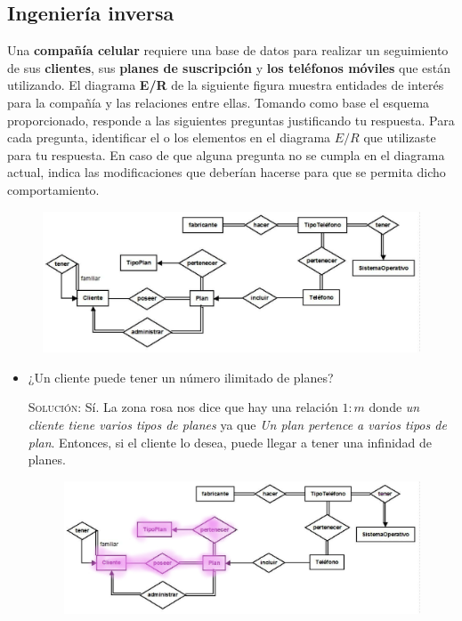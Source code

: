 \documentclass[letterpaper,11pt]{article}
\begin{document}
\begin{itemize}
\section{Ingeniería inversa}
Una \textbf{compañía celular} requiere una base de datos para realizar un 
seguimiento de sus \textbf{clientes}, sus \textbf{planes de suscripción} y 
\textbf{los teléfonos móviles} que están utilizando. El diagrama \textbf{E/R}
de la siguiente figura muestra entidades de interés para la compañía y las 
relaciones entre ellas. Tomando como base el esquema proporcionado, responde a 
las siguientes preguntas justificando tu respuesta. Para cada pregunta, 
identificar el o los elementos en el diagrama $E/R$ que utilizaste para tu 
respuesta. En caso de que alguna pregunta no se cumpla en el diagrama actual, 
indica las modificaciones que deberían hacerse para que se permita dicho 
comportamiento.

\begin{figure}[h]
    \centering
    \includegraphics[scale=0.4]{./imagenes/modelo.jpg}
\end{figure}

\begin{itemize}
    \item ¿Un cliente puede tener un número ilimitado de planes?

    \textsc{Solución:} Sí. La zona rosa nos dice que hay una relación $1:m$ 
    donde \textit{un cliente tiene varios tipos de planes} ya que 
    \textit{Un plan pertence a varios tipos de plan}. Entonces, si el 
    cliente lo desea, puede llegar a tener una infinidad de planes.

    \begin{figure}[h]
        \centering
        \includegraphics[scale=0.4]{./imagenes/modelo1.jpg}
    \end{figure}
    

\end{itemize}
\end{itemize}
\end{document}
